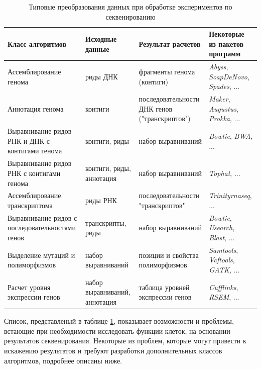 \begin{table}[htbp]
\caption{Типовые преобразования данных при обработке экспериментов по секвенированию}\label{tab:rnaseq_tools}
\begin{tabular}{|m{}|m{}|m{}|m{}|}
\hline
\textbf{Класс алгоритмов}&\textbf{Исходные данные}&\textbf{Результат расчетов}&\textbf{Некоторые из пакетов программ}\\
\hline
Ассемблирование генома&риды ДНК&фрагменты генома (контиги)&\textit{Abyss}, \textit{SoapDeNovo}, \textit{Spades}, ... \\
\hline
Аннотация генома&контиги&последовательности ДНК генов ("транскриптов")&\textit{Maker}, \textit{Augustus}, \textit{Prokka}, ... \\
\hline
Выравнивание ридов РНК и ДНК с контигами генома&контиги, риды&набор выравниваний&\textit{Bowtie}, \textit{BWA}, ... \\
\hline
Выравнивание ридов РНК с контигами генома&контиги, риды, аннотация&набор выравниваний&\textit{Tophat}, ... \\
\hline
Ассемблирование транскриптома&риды РНК&последовательности "транскриптов"&\textit{Trinityrnaseq}, ...\\
\hline
Выравнивание ридов с последовательностями генов&транскрипты, риды&набор выравниваний&\textit{Bowtie}, \textit{Usearch}, \textit{Blast}, ... \\
\hline
Выделение мутаций и полиморфизмов&набор выравниваний&позиции и свойства полиморфизмов&\textit{Samtools}, \textit{Vcftools}, \textit{GATK}, ... \\
\hline
Расчет уровня экспрессии генов&набор выравниваний, аннотация& таблица уровней экспрессии генов&\textit{Cufflinks}, \textit{RSEM}, ... \\
\hline
\end{tabular}
\end{table}

Список, представленый в таблице \ref{tab:rnaseq_tools}, показывает возможности и проблемы, встающие при необходимости исследовать функции клеток, на основании результатов секвенирования. Некоторые из проблем, которые могут привести к искажению результатов и требуют разработки дополнительных классов алгоритмов, подробнее описаны ниже.  

